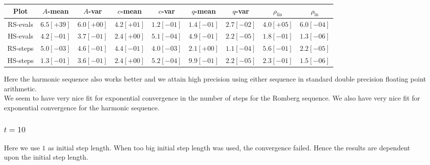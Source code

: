 \begin{table}[H]
    \centering
    \small
    \begin{tabular}{c||c|c|c|c|c|c|c|c}
Plot & \(A\)-mean & \(A\)-var & \(c\)-mean & \(c\)-var & \(q\)-mean & \(q\)-var & \(\rho_{\operatorname{lin}}\) & \(\rho_{\ln}\)\\\hline
\rowcolor{red}
RS-evals & \(6.5[+39]\) & \(6.0[+00]\) & \(4.2[+01]\) & \(1.2[-01]\) & \(1.4[-01]\) & \(2.7[-02]\) & \(4.0[+05]\) & \(6.0[-04]\) \\
\rowcolor{green}
HS-evals & \(4.2[-01]\) & \(3.7[-01]\) & \(2.4[+00]\) & \(5.1[-04]\) & \(4.9[-01]\) & \(2.2[-05]\) & \(1.8[-01]\) & \(1.3[-06]\) \\
\rowcolor{green}
RS-steps & \(5.0[-03]\) & \(4.6[-01]\) & \(4.4[-01]\) & \(4.0[-03]\) & \(2.1[+00]\) & \(1.1[-04]\) & \(5.6[-01]\) & \(2.2[-05]\) \\
\rowcolor{green}
HS-steps & \(1.3[-01]\) & \(3.6[-01]\) & \(2.4[+00]\) & \(5.2[-04]\) & \(9.9[-01]\) & \(2.2[-05]\) & \(2.3[-01]\) & \(1.5[-06]\) \\
    \end{tabular}
    \label{tab:my_label}
\end{table}

Here the harmonic sequence also works better and we attain high precision using either sequence in standard double precision floating point arithmetic.\\

We seem to have very nice fit for exponential convergence in the number of steps for the Romberg sequence. We also have very nice fit for exponential convergence for the harmonic sequence.

\subsubsection{\(t = 10\)}

Here we use \(1\) as initial step length. When too big initial step length was used, the convergence failed. Hence the results are dependent upon the initial step length. 

